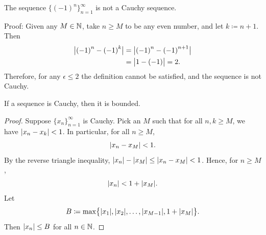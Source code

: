 \begin{example}
The sequence $\bigl\{ {(-1)}^n \bigr\}_{n=1}^\infty$ is not a Cauchy sequence.

Proof:
Given any $M \in {\mathbb{N}}$, take $n \geq M$ to be any even number, and
let $k \coloneqq n+1$.  Then
\begin{equation*}
\begin{split}
\bigl\lvert {{(-1)}^n - {(-1)}^k} \bigr\rvert
& =
\bigl\lvert {{(-1)}^n - {(-1)}^{n+1}} \bigr\rvert
\\
& =
\bigl\lvert {1 - (-1)} \bigr\rvert = 2 .
\end{split}
\end{equation*}
Therefore, for any $\epsilon \leq 2$ the definition cannot be satisfied, and
the sequence is not Cauchy.
\end{example}

%

\begin{prop}
If a sequence is Cauchy, then it is bounded.
\end{prop}

\begin{proof}
Suppose $\{ x_n \}_{n=1}^\infty$ is Cauchy.  Pick an $M$ such that for all
$n,k \geq M$, we have $\lvert {x_n-x_k} \rvert < 1$.  In particular, 
for all $n \geq M$,
\begin{equation*}
\lvert {x_n - x_M} \rvert < 1 .
\end{equation*}
By the reverse triangle inequality,
$\lvert {x_n} \rvert - \lvert {x_M} \rvert \leq \lvert {x_n - x_M} \rvert < 1$.  Hence, for $n \geq M$,
\begin{equation*}
\lvert {x_n} \rvert < 1 + \lvert {x_M} \rvert.
\end{equation*}
Let
\begin{equation*}
B \coloneqq \max \bigl\{ \lvert {x_1} \rvert, \lvert {x_2} \rvert, \ldots,
\lvert {x_{M-1}} \rvert, 1+ \lvert {x_M} \rvert \bigr\} .
\end{equation*}
Then $\lvert {x_n} \rvert \leq B$ for all $n \in {\mathbb{N}}$.
\end{proof}

